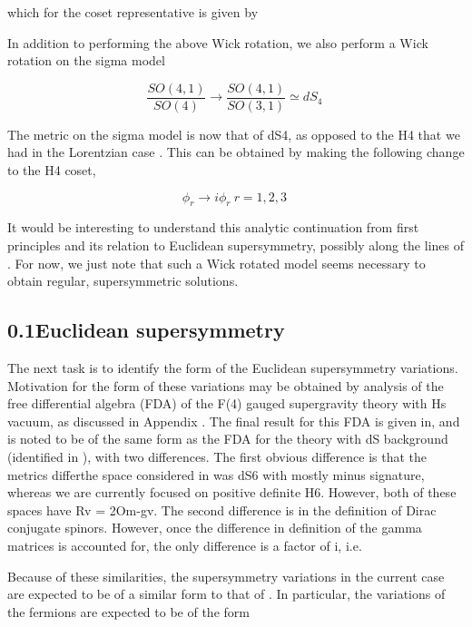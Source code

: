 \documentclass{article}
\begin{document}
\sloppy

which for the coset representative is given by


In addition to performing the above Wick rotation, we also perform a Wick rotation on the
sigma model


\begin{equation}
\frac { S O ( 4, 1 ) } { S O ( 4 ) } \rightarrow \frac { S O ( 4, 1 ) } { S O ( 3, 1 ) } \simeq d S _ { 4 } ~
\end{equation}


The metric on the sigma model is now that of dS4, as opposed to the H4 that we had in the
Lorentzian case . This can be obtained by making the following change to the H4 coset,


\begin{equation}
\phi _ { r } \rightarrow i \phi _ { r } ~ r = 1, 2, 3 ~
\end{equation}


It would be interesting to understand this analytic continuation from first principles and its
relation to Euclidean supersymmetry, possibly along the lines of . For now, we just note that
such a Wick rotated model seems necessary to obtain regular, supersymmetric solutions.


\subsection*{0.1Euclidean supersymmetry}


The next task is to identify the form of the Euclidean supersymmetry variations. Motivation
for the form of these variations may be obtained by analysis of the free differential algebra
(FDA) of the F(4) gauged supergravity theory with Hs vacuum, as discussed in Appendix .
The final result for this FDA is given in, and is noted to be of the same form as the FDA
for the theory with dS background (identified in ), with two differences. The first obvious
difference is that the metrics differthe space considered in was dS6 with mostly minus
signature, whereas we are currently focused on positive definite H6. However, both of these
spaces have Rv = 2Om-gv. The second difference is in the definition of Dirac conjugate
spinors. However, once the difference in definition of the gamma matrices is accounted for,
the only difference is a factor of i, i.e.


Because of these similarities, the supersymmetry variations in the current case are expected
to be of a similar form to that of . In particular, the variations of the fermions are expected
to be of the form
\end{document}
